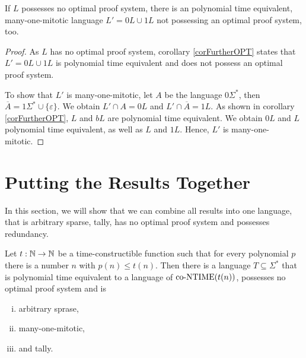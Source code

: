   \begin{theorem} \label{thmMitotic}
    If \(L\) possesses no optimal proof system, there is an polynomial time equivalent, many-one-mitotic language \(L' = 0L \cup 1L\) not possessing an optimal proof system, too.
  \end{theorem}

  \begin{proof}
    As \(L\) has no optimal proof system, corollary \ref{corFurtherOPT} states that \(L' = 0L \cup 1L\) is polynomial time equivalent and does not possess an optimal proof system.

    To show that \(L'\) is many-one-mitotic, let \(A\) be the language \(0\Sigma^*\), then \(\overline{A} = 1\Sigma^* \cup \{ \varepsilon \}\). We obtain \(L' \cap A = 0L\) and \(L' \cap \overline{A} = 1L\). As shown in corollary \ref{corFurtherOPT}, \(L\) and \(bL\) are polynomial time equivalent. We obtain \(0L\) and \(L\) polynomial time equivalent, as well as \(L\) and \(1L\). Hence, \(L'\) is many-one-mitotic.
  \end{proof}
  
  
  \section{Putting the Results Together}
  
  In this section, we will show that we can combine all results into one language, that is arbitrary sparse, tally, has no optimal proof system and possesses redundancy.
  
  \begin{corollary}
    Let \(t:\mathbb{N}\to\mathbb{N}\) be a time-constructible function such that for every polynomial \(p\) there is a number \(n\) with \(p(n) \leq t(n)\). Then there is a language \(T \subseteq \Sigma^*\) that is polynomial time equivalent to a language of \(\text{co-NTIME}(t(n))\), possesses no optimal proof system and is
    \begin{enumerate}[(i)]
     \item arbitrary sprase,
     \item many-one-mitotic,
     \item and tally.
    \end{enumerate}
  \end{corollary}
  

